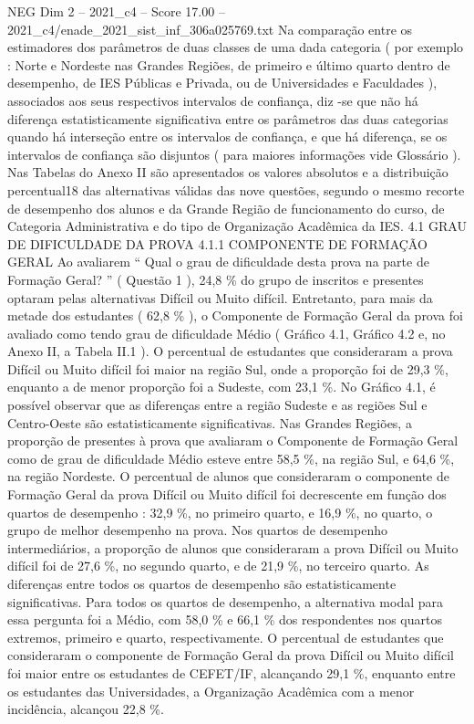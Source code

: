 \begin{textsample}{NEG Dim 2 – 2021\_c4 – Score 17.00 – 2021\_c4/enade\_2021\_sist\_inf\_306a025769.txt}
Na comparação entre os estimadores dos parâmetros de duas classes de uma dada categoria ( por exemplo : Norte e Nordeste nas Grandes Regiões, de primeiro e último quarto dentro de desempenho, de IES Públicas e Privada, ou de Universidades e Faculdades ), associados aos seus respectivos intervalos de confiança, diz -se que não há diferença estatisticamente significativa entre os parâmetros das duas categorias quando há interseção entre os intervalos de confiança, e que há diferença, se os intervalos de confiança são disjuntos ( para maiores informações vide Glossário ).
Nas Tabelas do Anexo II são apresentados os valores absolutos e a distribuição percentual18 das alternativas válidas das nove questões, segundo o mesmo recorte de desempenho dos alunos e da Grande Região de funcionamento do curso, de Categoria Administrativa e do tipo de Organização Acadêmica da IES. 4.1 GRAU DE DIFICULDADE DA PROVA 4.1.1 COMPONENTE DE FORMAÇÃO GERAL Ao avaliarem “ Qual o grau de dificuldade desta prova na parte de Formação Geral? ” ( Questão 1 ), 24,8 \% do grupo de inscritos e presentes optaram pelas alternativas Difícil ou Muito difícil.
Entretanto, para mais da metade dos estudantes ( 62,8 \% ), o Componente de Formação Geral da prova foi avaliado como tendo grau de dificuldade Médio ( Gráfico 4.1, Gráfico 4.2 e, no Anexo II, a Tabela II.1 ).
O percentual de estudantes que consideraram a prova Difícil ou Muito difícil foi maior na região Sul, onde a proporção foi de 29,3 \%, enquanto a de menor proporção foi a Sudeste, com 23,1 \%.
No Gráfico 4.1, é possível observar que as diferenças entre a região Sudeste e as regiões Sul e Centro-Oeste são estatisticamente significativas.
Nas Grandes Regiões, a proporção de presentes à prova que avaliaram o Componente de Formação Geral como de grau de dificuldade Médio esteve entre 58,5 \%, na região Sul, e 64,6 \%, na região Nordeste.
O percentual de alunos que consideraram o componente de Formação Geral da prova Difícil ou Muito difícil foi decrescente em função dos quartos de desempenho : 32,9 \%, no primeiro quarto, e 16,9 \%, no quarto, o grupo de melhor desempenho na prova.
Nos quartos de desempenho intermediários, a proporção de alunos que consideraram a prova Difícil ou Muito difícil foi de 27,6 \%, no segundo quarto, e de 21,9 \%, no terceiro quarto.
As diferenças entre todos os quartos de desempenho são estatisticamente significativas.
Para todos os quartos de desempenho, a alternativa modal para essa pergunta foi a Médio, com 58,0 \% e 66,1 \% dos respondentes nos quartos extremos, primeiro e quarto, respectivamente.
O percentual de estudantes que consideraram o componente de Formação Geral da prova Difícil ou Muito difícil foi maior entre os estudantes de CEFET/IF, alcançando 29,1 \%, enquanto entre os estudantes das Universidades, a Organização Acadêmica com a menor incidência, alcançou 22,8 \%.

\end{textsample}
